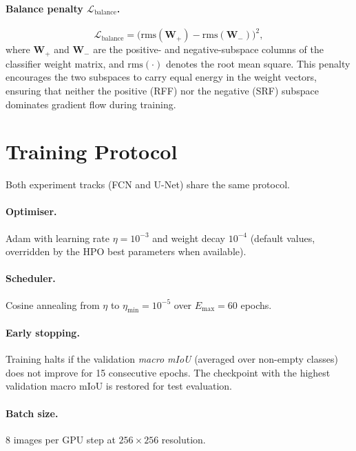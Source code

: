 \documentclass[12pt,a4paper]{article}
\theoremstyle{definition}
\begin{document}
\paragraph{Balance penalty $\mathcal{L}_{\text{balance}}$.}
\[
  \mathcal{L}_{\text{balance}}
  = \bigl(\mathrm{rms}(\mathbf{W}_+) - \mathrm{rms}(\mathbf{W}_-)\bigr)^2,
\]
where $\mathbf{W}_+$ and $\mathbf{W}_-$ are the positive- and
negative-subspace columns of the classifier weight matrix, and
$\mathrm{rms}(\cdot)$ denotes the root mean square.  This penalty encourages
the two subspaces to carry equal energy in the weight vectors, ensuring that
neither the positive (RFF) nor the negative (SRF) subspace dominates
gradient flow during training.

\section{Training Protocol}

Both experiment tracks (FCN and U-Net) share the same protocol.

\paragraph{Optimiser.}  Adam with learning rate $\eta = 10^{-3}$ and weight
decay $10^{-4}$ (default values, overridden by the HPO best parameters when
available).

\paragraph{Scheduler.}  Cosine annealing from $\eta$ to
$\eta_{\min} = 10^{-5}$ over $E_{\max} = 60$ epochs.

\paragraph{Early stopping.}  Training halts if the validation \emph{macro
mIoU} (averaged over non-empty classes) does not improve for 15 consecutive
epochs.  The checkpoint with the highest validation macro mIoU is restored
for test evaluation.

\paragraph{Batch size.}  8 images per GPU step at $256\times256$ resolution.
\end{document}
